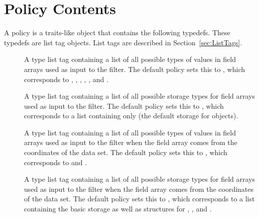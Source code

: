 


\section{Policy Contents}

A policy is a traits-like object that contains the following typedefs.
 These typedefs are list tag objects.
List tags are described in Section~\ref{sec:ListTags}.

\begin{description}
\item[] 
  A type list tag containing a list of all possible types of values in field arrays used as input to the filter.
  The default policy sets this to , which corresponds to , , , , , and .
\item[] 
  A type list tag containing a list of all possible storage types for field arrays used as input to the filter.
  The default policy sets this to , which corresponds to a list containing only  (the default storage for  objects).
\item[] 
  A type list tag containing a list of all possible types of values in field arrays used as input to the filter when the field array comes from the coordinates of the data set.
  The default policy sets this to , which corresponds to  and .
\item[] 
  A type list tag containing a list of all possible storage types for field arrays used as input to the filter when the field array comes from the coordinates of the data set.
  The default policy sets this to , which corresponds to a list containing the basic  storage as well as structures for , , and .

\end{description}
